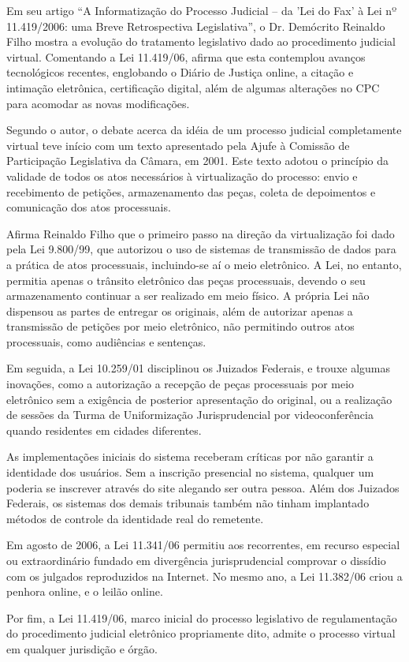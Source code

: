 	Em seu artigo “A Informatização do Processo Judicial – da 'Lei do Fax' à Lei nº 11.419/2006: uma Breve Retrospectiva Legislativa”, o Dr. Demócrito Reinaldo Filho mostra a evolução do tratamento legislativo dado ao procedimento judicial virtual. Comentando a Lei 11.419/06, afirma que esta contemplou avanços tecnológicos recentes, englobando o Diário de Justiça online, a citação e intimação eletrônica, certificação digital, além de algumas alterações no CPC para acomodar as novas modificações.\par
	
	Segundo o autor, o debate acerca da idéia de um processo judicial completamente virtual teve início com um texto apresentado pela Ajufe à Comissão de Participação Legislativa da Câmara, em 2001. Este texto adotou o princípio da validade de todos os atos necessários à virtualização do processo: envio e recebimento de petições, armazenamento das peças, coleta de depoimentos e comunicação dos atos processuais.\par
	
	Afirma Reinaldo Filho que o primeiro passo na direção da virtualização foi dado pela Lei 9.800/99, que autorizou o uso de sistemas de transmissão de dados para a prática de atos processuais, incluindo-se aí o meio eletrônico. A Lei, no entanto, permitia apenas o trânsito eletrônico das peças processuais, devendo o seu armazenamento continuar a ser realizado em meio físico. A própria Lei não dispensou as partes de entregar os originais, além de autorizar apenas a transmissão de petições por meio eletrônico, não permitindo outros atos processuais, como audiências e sentenças.\par
	
	Em seguida, a Lei 10.259/01 disciplinou os Juizados Federais, e trouxe algumas inovações, como a autorização a recepção de peças processuais por meio eletrônico sem a exigência de posterior apresentação do original, ou a realização de sessões da Turma de Uniformização Jurisprudencial por videoconferência quando residentes em cidades diferentes. \par
	
	As implementações iniciais do sistema receberam críticas por não garantir a identidade dos usuários. Sem a inscrição presencial no sistema, qualquer um poderia se inscrever através do site alegando ser outra pessoa. Além dos Juizados Federais, os sistemas dos demais tribunais também não tinham implantado métodos de controle da identidade real do remetente.\par
	
	Em agosto de 2006, a Lei 11.341/06 permitiu aos recorrentes, em recurso especial ou extraordinário fundado em divergência jurisprudencial comprovar o dissídio com os julgados reproduzidos na Internet. No mesmo ano, a Lei 11.382/06 criou a penhora online, e o leilão online. \par
	
	Por fim, a Lei 11.419/06, marco inicial do processo legislativo de regulamentação do procedimento judicial eletrônico propriamente dito, admite o processo virtual em qualquer jurisdição e órgão. \par
